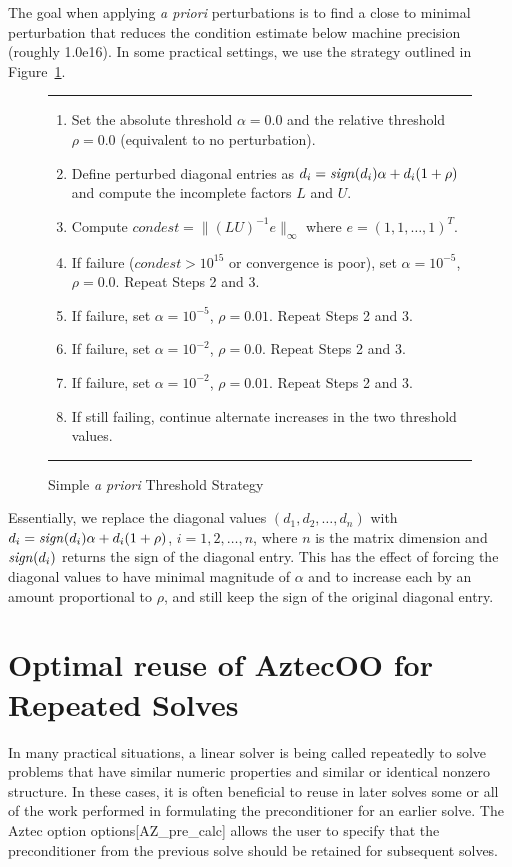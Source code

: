 \documentclass[12pt,relax]{AztecOOUserGuide}
\newcommand{\sign}{{\it sign}}
\begin{document}
The goal when applying {\it a priori} perturbations is to find a close to minimal
perturbation that reduces the condition estimate below machine
precision (roughly 1.0e16).  In some practical settings,
we use the strategy outlined in
Figure~\ref{f:aprioristrategy}.
{\small
\begin{figure}
\vspace{.05in}
\hrule
\vspace{.1in}
\begin{enumerate}
\item Set the absolute threshold $\alpha = 0.0$ and the relative
threshold $\rho = 0.0$ (equivalent to no perturbation).
\item Define perturbed diagonal entries as $d_{i} = \sign(d_i)\alpha +
d_i(1+\rho)$ and compute the incomplete factors $L$ and $U$.
\item Compute $condest = \|(LU)^{-1}e\|_\infty$ where $e = (1, 1,
\ldots, 1)^T$.
\item If failure ($condest > 10^{15}$ or convergence is poor), set $\alpha =
10^{-5}$, $\rho = 0.0$.  Repeat Steps 2 and 3.
\item If failure, set $\alpha =
10^{-5}$, $\rho = 0.01$. Repeat Steps 2 and 3.
\item If failure, set $\alpha =
10^{-2}$, $\rho = 0.0$. Repeat Steps 2 and 3.
\item If failure, set $\alpha =
10^{-2}$, $\rho = 0.01$. Repeat Steps 2 and 3.
\item If still failing, continue alternate increases in
   the two threshold values.
\end{enumerate}
\vspace{.1in}
\hrule
\caption{Simple {\it a priori} Threshold Strategy}
\label{f:aprioristrategy}
\end{figure}
} Essentially, we replace the diagonal values $(d_1, d_2, \ldots,
d_n)$ with $d_i = \sign(d_i)\alpha + d_i(1+\rho)$, $i=1, 2, \ldots,
n$, where $n$ is the matrix dimension and $\sign(d_i)$ returns the
sign of the diagonal entry.  This has the effect of forcing the
diagonal values to have minimal magnitude of $\alpha$ and to
increase each by an amount proportional to $\rho$, and still keep
the sign of the original diagonal entry.


\section {Optimal reuse of AztecOO for Repeated Solves}

In many practical situations, a linear solver is being called
repeatedly to solve problems that have similar numeric properties and
similar or identical nonzero structure.  In these cases, it is often
beneficial to reuse in later solves some or all of the work performed
in formulating the preconditioner for an earlier solve.  The Aztec
option options[{\sf AZ\_pre\_calc}] allows the user to specify that the
preconditioner from the previous solve should be retained for
subsequent solves.
\end{document}
